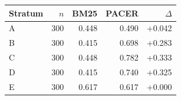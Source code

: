 \begin{tabular}{lrrrr}
\hline
Stratum & $n$ & BM25 & PACER & $\Delta$ \\
\hline
A & 300 & 0.448 & 0.490 & +0.042 \\
B & 300 & 0.415 & 0.698 & +0.283 \\
C & 300 & 0.448 & 0.782 & +0.333 \\
D & 300 & 0.415 & 0.740 & +0.325 \\
E & 300 & 0.617 & 0.617 & +0.000 \\
\hline
\end{tabular}

